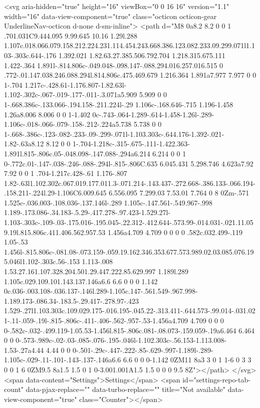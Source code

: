 {{              <svg aria-hidden="true" height="16" viewBox="0 0 16 16" version="1.1" width="16" data-view-component="true" class="octicon octicon-gear UnderlineNav-octicon d-none d-sm-inline">
    <path d="M8 0a8.2 8.2 0 0 1 .701.031C9.444.095 9.99.645 10.16 1.29l.288 1.107c.018.066.079.158.212.224.231.114.454.243.668.386.123.082.233.09.299.071l1.103-.303c.644-.176 1.392.021 1.82.63.27.385.506.792.704 1.218.315.675.111 1.422-.364 1.891l-.814.806c-.049.048-.098.147-.088.294.016.257.016.515 0 .772-.01.147.038.246.088.294l.814.806c.475.469.679 1.216.364 1.891a7.977 7.977 0 0 1-.704 1.217c-.428.61-1.176.807-1.82.63l-1.102-.302c-.067-.019-.177-.011-.3.071a5.909 5.909 0 0 1-.668.386c-.133.066-.194.158-.211.224l-.29 1.106c-.168.646-.715 1.196-1.458 1.26a8.006 8.006 0 0 1-1.402 0c-.743-.064-1.289-.614-1.458-1.26l-.289-1.106c-.018-.066-.079-.158-.212-.224a5.738 5.738 0 0 1-.668-.386c-.123-.082-.233-.09-.299-.071l-1.103.303c-.644.176-1.392-.021-1.82-.63a8.12 8.12 0 0 1-.704-1.218c-.315-.675-.111-1.422.363-1.891l.815-.806c.05-.048.098-.147.088-.294a6.214 6.214 0 0 1 0-.772c.01-.147-.038-.246-.088-.294l-.815-.806C.635 6.045.431 5.298.746 4.623a7.92 7.92 0 0 1 .704-1.217c.428-.61 1.176-.807 1.82-.63l1.102.302c.067.019.177.011.3-.071.214-.143.437-.272.668-.386.133-.066.194-.158.211-.224l.29-1.106C6.009.645 6.556.095 7.299.03 7.53.01 7.764 0 8 0Zm-.571 1.525c-.036.003-.108.036-.137.146l-.289 1.105c-.147.561-.549.967-.998 1.189-.173.086-.34.183-.5.29-.417.278-.97.423-1.529.27l-1.103-.303c-.109-.03-.175.016-.195.045-.22.312-.412.644-.573.99-.014.031-.021.11.059.19l.815.806c.411.406.562.957.53 1.456a4.709 4.709 0 0 0 0 .582c.032.499-.119 1.05-.53 1.456l-.815.806c-.081.08-.073.159-.059.19.162.346.353.677.573.989.02.03.085.076.195.046l1.102-.303c.56-.153 1.113-.008 1.53.27.161.107.328.204.501.29.447.222.85.629.997 1.189l.289 1.105c.029.109.101.143.137.146a6.6 6.6 0 0 0 1.142 0c.036-.003.108-.036.137-.146l.289-1.105c.147-.561.549-.967.998-1.189.173-.086.34-.183.5-.29.417-.278.97-.423 1.529-.27l1.103.303c.109.029.175-.016.195-.045.22-.313.411-.644.573-.99.014-.031.021-.11-.059-.19l-.815-.806c-.411-.406-.562-.957-.53-1.456a4.709 4.709 0 0 0 0-.582c-.032-.499.119-1.05.53-1.456l.815-.806c.081-.08.073-.159.059-.19a6.464 6.464 0 0 0-.573-.989c-.02-.03-.085-.076-.195-.046l-1.102.303c-.56.153-1.113.008-1.53-.27a4.44 4.44 0 0 0-.501-.29c-.447-.222-.85-.629-.997-1.189l-.289-1.105c-.029-.11-.101-.143-.137-.146a6.6 6.6 0 0 0-1.142 0ZM11 8a3 3 0 1 1-6 0 3 3 0 0 1 6 0ZM9.5 8a1.5 1.5 0 1 0-3.001.001A1.5 1.5 0 0 0 9.5 8Z"></path>
</svg>
        <span data-content="Settings">Settings</span>
          <span id="settings-repo-tab-count" data-pjax-replace="" data-turbo-replace="" title="Not available" data-view-component="true" class="Counter"></span>


}}
